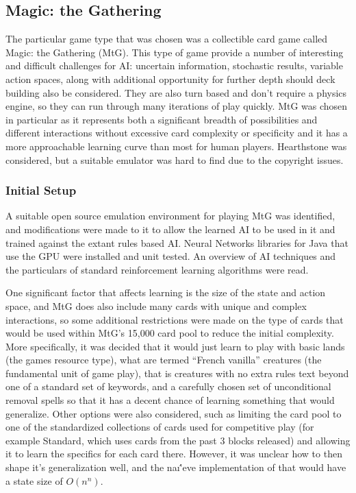   \subsection{Magic: the Gathering}
  The particular game type that was chosen was a collectible card game called Magic: the Gathering (MtG). This type of game provide a number of interesting and difficult challenges for AI: uncertain information, stochastic results, variable action spaces, along with additional opportunity for further depth should deck building also be considered. They are also turn based and don't require a physics engine, so they can run through many iterations of play quickly. MtG was chosen in particular as it represents both a significant breadth of possibilities and different interactions without excessive card complexity or specificity and it has a more approachable learning curve than most for human players. Hearthstone was considered, but a suitable emulator was hard to find due to the copyright issues. 
 \subsubsection{Initial Setup}

  
      A suitable open source emulation environment for playing MtG was identified, and modifications were made to it to allow the learned AI to be used in it and trained against the extant rules based AI. Neural Networks libraries for Java that use the GPU were installed and unit tested. An overview of AI techniques and the particulars of standard reinforcement learning algorithms were read.
      
One significant factor that affects learning is the size of the state and action space, and MtG does also include many cards with unique and complex interactions, so some additional restrictions were made on the type of cards that would be used within MtG's 15,000 card pool to reduce the initial complexity. More specifically, it was decided that it would just learn to play with basic lands (the games resource type), what are termed ``French vanilla'' creatures (the fundamental unit of game play), that is creatures with no extra rules text beyond one of a standard set of keywords, and a carefully chosen set of unconditional removal spells so that it has a decent chance of learning something that would generalize. Other options were also considered, such as limiting the card pool to one of the standardized collections of cards used for competitive play (for example Standard, which uses cards from the past 3 blocks released) and allowing it to learn the specifics for each card there. However, it was unclear how to then shape it's generalization well, and the na\i\''eve implementation of that would have a state size of $O(n^n)$. 

